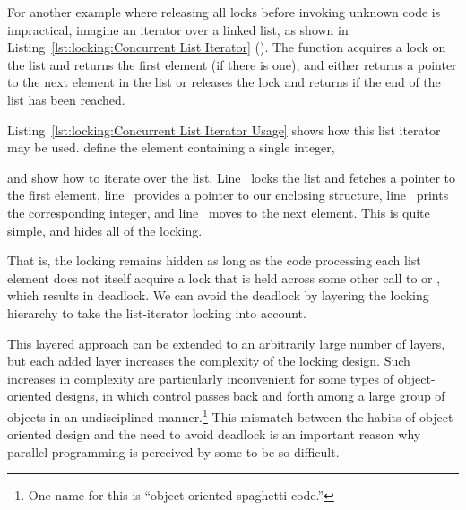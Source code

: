 For another example where releasing all locks before invoking unknown
code is impractical, imagine an iterator over a linked list, as shown in
Listing~\ref{lst:locking:Concurrent List Iterator} ().
The  function acquires a lock on the list and returns
the first element (if there is one), and
 either returns a pointer to the next element in the list
or releases the lock and returns  if the end of the list has
been reached.

\begin{listing}[tbp]

\caption{Concurrent List Iterator Usage}
\label{lst:locking:Concurrent List Iterator Usage}
\end{listing}

\begin{fcvref}
Listing~\ref{lst:locking:Concurrent List Iterator Usage} shows how
this list iterator may be used.
 define the  element
containing a single integer,
\end{fcvref}
\begin{fcvref}
and  show how to iterate over the list.
Line~ locks the list and fetches a pointer to the first element,
line~ provides a pointer to our enclosing  structure,
line~ prints the corresponding integer, and
line~ moves to the next element.
This is quite simple, and hides all of the locking.
\end{fcvref}

That is, the locking remains hidden as long as the code processing each
list element does not itself acquire a lock that is held across some
other call to  or , which results in
deadlock.
We can avoid the deadlock by layering the locking hierarchy
to take the list-iterator locking into account.

This layered approach can be extended to an arbitrarily large number of layers,
but each added layer increases the complexity of the locking design.
Such increases in complexity are particularly inconvenient for some
types of object-oriented designs, in which control passes back and forth
among a large group of objects in an undisciplined manner.\footnote{
	One name for this is ``object-oriented spaghetti code.''}
This mismatch between the habits of object-oriented design and the
need to avoid deadlock is an important reason why parallel programming
is perceived by some to be so difficult.

